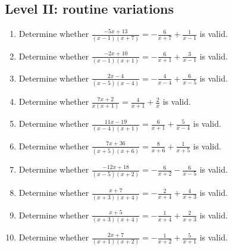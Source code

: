 \documentclass[11pt,oneside]{book}
\begin{document}
\subsection*{Level II: routine variations}
\begin{enumerate}[leftmargin=*,label=\textbf{\arabic*.},itemsep=0.65\baselineskip]
\item Determine whether $\displaystyle \frac{- 5 x + 13}{\left(x - 1\right) \left(x + 7\right)}=- \frac{6}{x + 7} + \frac{1}{x - 1}$ is valid.
\item Determine whether $\displaystyle \frac{- 2 x + 10}{\left(x - 1\right) \left(x + 1\right)}=- \frac{6}{x + 1} + \frac{3}{x - 1}$ is valid.
\item Determine whether $\displaystyle \frac{2 x - 4}{\left(x - 5\right) \left(x - 4\right)}=- \frac{4}{x - 4} + \frac{6}{x - 5}$ is valid.
\item Determine whether $\displaystyle \frac{7 x + 2}{x \left(x + 1\right)}=\frac{4}{x + 1} + \frac{2}{x}$ is valid.
\item Determine whether $\displaystyle \frac{11 x - 19}{\left(x - 4\right) \left(x + 1\right)}=\frac{6}{x + 1} + \frac{5}{x - 4}$ is valid.
\item Determine whether $\displaystyle \frac{7 x + 36}{\left(x + 5\right) \left(x + 6\right)}=\frac{8}{x + 6} + \frac{1}{x + 5}$ is valid.
\item Determine whether $\displaystyle \frac{- 12 x + 18}{\left(x - 5\right) \left(x + 2\right)}=- \frac{6}{x + 2} - \frac{6}{x - 5}$ is valid.
\item Determine whether $\displaystyle \frac{x + 7}{\left(x + 3\right) \left(x + 4\right)}=- \frac{2}{x + 4} + \frac{4}{x + 3}$ is valid.
\item Determine whether $\displaystyle \frac{x + 5}{\left(x + 3\right) \left(x + 4\right)}=- \frac{1}{x + 4} + \frac{2}{x + 3}$ is valid.
\item Determine whether $\displaystyle \frac{2 x + 7}{\left(x + 1\right) \left(x + 2\right)}=- \frac{1}{x + 2} + \frac{5}{x + 1}$ is valid.
\end{enumerate}
\end{document}

